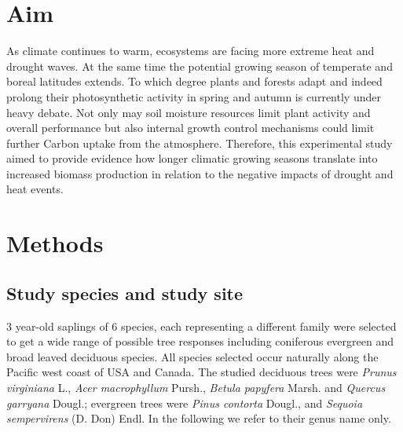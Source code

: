 \documentclass{article}
\begin{document}
	
	
	
	
	\date{\today}
	
	\section*{Aim}
	As climate continues to warm, ecosystems are facing more extreme heat and drought waves. At the same time the potential growing season of temperate and boreal latitudes extends. To which degree plants and forests adapt and indeed prolong their photosynthetic activity in spring and autumn is currently under heavy debate. Not only may soil moisture resources limit plant activity and overall performance but also internal growth control mechanisms could limit further Carbon uptake from the atmosphere. Therefore, this experimental study aimed to provide evidence how longer climatic growing seasons translate into increased biomass production in relation to the negative impacts of drought and heat events. 
	
	\section*{Methods}
	\subsection*{Study species and study site}
	3 year-old saplings of 6 species, each representing a different family were selected to get a wide range of possible tree responses including coniferous evergreen and broad leaved deciduous species. All species selected occur naturally along the Pacific west coast of USA and Canada. The studied deciduous trees were \textit{Prunus virginiana} L., \textit{Acer macrophyllum} Pursh., \textit{Betula papyfera} Marsh. and \textit{Quercus garryana} Dougl.; evergreen trees were \textit{Pinus contorta} Dougl., and \textit{Sequoia sempervirens} (D. Don) Endl. In the following we refer to their genus name only.
	
\end{document}
